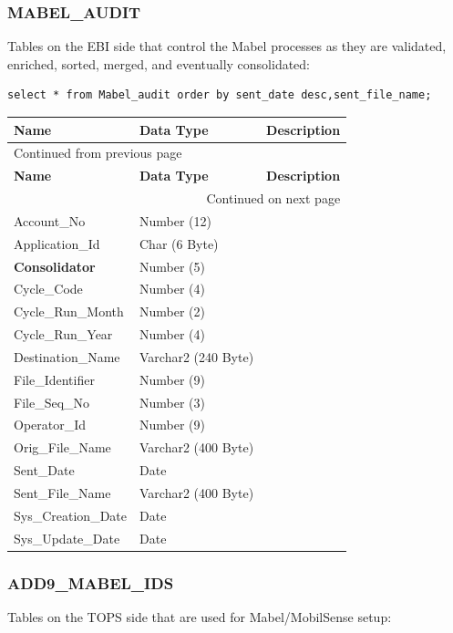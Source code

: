 \documentclass[12pt,twoside]{article}
\begin{document}
\normalsize

\subsubsection{MABEL\_AUDIT}
\label{sec:orgheadline147}
Tables on the EBI side that control the Mabel processes as they are validated, enriched, sorted, merged, and eventually consolidated:
\begin{verbatim}
select * from Mabel_audit order by sent_date desc,sent_file_name;
\end{verbatim}

\footnotesize
\begin{longtable}{l|l|l}
\hline
\textbf{Name} & \textbf{Data Type} & \textbf{Description}\\
\hline
\endfirsthead
\multicolumn{3}{l}{Continued from previous page} \\
\hline

\textbf{Name} & \textbf{Data Type} & \textbf{Description} \\

\hline
\endhead
\hline\multicolumn{3}{r}{Continued on next page} \\
\endfoot
\endlastfoot
\hline
Account\_No & Number (12) & \\
Application\_Id & Char (6 Byte) & \\
\textbf{Consolidator} & Number (5) & \\
Cycle\_Code & Number (4) & \\
Cycle\_Run\_Month & Number (2) & \\
Cycle\_Run\_Year & Number (4) & \\
Destination\_Name & Varchar2 (240 Byte) & \\
File\_Identifier & Number (9) & \\
File\_Seq\_No & Number (3) & \\
Operator\_Id & Number (9) & \\
Orig\_File\_Name & Varchar2 (400 Byte) & \\
Sent\_Date & Date & \\
Sent\_File\_Name & Varchar2 (400 Byte) & \\
Sys\_Creation\_Date & Date & \\
Sys\_Update\_Date & Date & \\
\hline
\end{longtable}

\normalsize

\subsubsection{ADD9\_MABEL\_IDS}
\label{sec:orgheadline148}
Tables on the TOPS side that are used for Mabel/MobilSense setup:
\footnotesize
\end{document}
